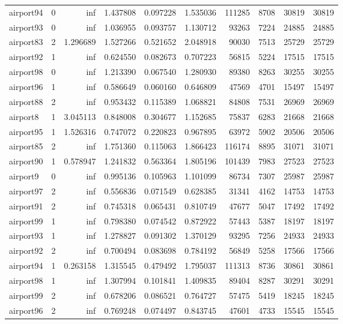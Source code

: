 \begin{longtable}{|l|r|r|r|r|r|r|r|r|r|}
airport94 & 0 & inf & 1.437808 & 0.097228 & 1.535036 & 111285 & 8708 & 30819 & 30819 \\
airport93 & 0 & inf & 1.036955 & 0.093757 & 1.130712 & 93263 & 7224 & 24885 & 24885 \\
airport83 & 2 & 1.296689 & 1.527266 & 0.521652 & 2.048918 & 90030 & 7513 & 25729 & 25729 \\
airport92 & 1 & inf & 0.624550 & 0.082673 & 0.707223 & 56815 & 5224 & 17515 & 17515 \\
airport98 & 0 & inf & 1.213390 & 0.067540 & 1.280930 & 89380 & 8263 & 30255 & 30255 \\
airport96 & 1 & inf & 0.586649 & 0.060160 & 0.646809 & 47569 & 4701 & 15497 & 15497 \\
airport88 & 2 & inf & 0.953432 & 0.115389 & 1.068821 & 84808 & 7531 & 26969 & 26969 \\
airport8 & 1 & 3.045113 & 0.848008 & 0.304677 & 1.152685 & 75837 & 6283 & 21668 & 21668 \\
airport95 & 1 & 1.526316 & 0.747072 & 0.220823 & 0.967895 & 63972 & 5902 & 20506 & 20506 \\
airport85 & 2 & inf & 1.751360 & 0.115063 & 1.866423 & 116174 & 8895 & 31071 & 31071 \\
airport90 & 1 & 0.578947 & 1.241832 & 0.563364 & 1.805196 & 101439 & 7983 & 27523 & 27523 \\
airport9 & 0 & inf & 0.995136 & 0.105963 & 1.101099 & 86734 & 7307 & 25987 & 25987 \\
airport97 & 2 & inf & 0.556836 & 0.071549 & 0.628385 & 31341 & 4162 & 14753 & 14753 \\
airport91 & 2 & inf & 0.745318 & 0.065431 & 0.810749 & 47677 & 5047 & 17492 & 17492 \\
airport99 & 1 & inf & 0.798380 & 0.074542 & 0.872922 & 57443 & 5387 & 18197 & 18197 \\
airport93 & 1 & inf & 1.278827 & 0.091302 & 1.370129 & 93295 & 7256 & 24933 & 24933 \\
airport92 & 2 & inf & 0.700494 & 0.083698 & 0.784192 & 56849 & 5258 & 17566 & 17566 \\
airport94 & 1 & 0.263158 & 1.315545 & 0.479492 & 1.795037 & 111313 & 8736 & 30861 & 30861 \\
airport98 & 1 & inf & 1.307994 & 0.101841 & 1.409835 & 89404 & 8287 & 30291 & 30291 \\
airport99 & 2 & inf & 0.678206 & 0.086521 & 0.764727 & 57475 & 5419 & 18245 & 18245 \\
airport96 & 2 & inf & 0.769248 & 0.074497 & 0.843745 & 47601 & 4733 & 15545 & 15545 \\

\end{longtable}
